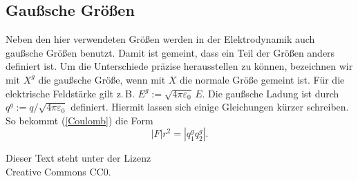 \documentclass[a4paper,10pt,fleqn,twocolumn,twoside,dvipdfmx]{scrartcl}
\begin{document}
\subsection{Gaußsche Größen}
Neben den hier verwendeten Größen werden in der Elektrodynamik
auch gaußsche Größen benutzt. Damit ist gemeint, dass ein Teil
der Größen anders definiert ist. Um die Unterschiede präzise
herausstellen zu können, bezeichnen wir mit $X^g$ die gaußsche Größe,
wenn mit $X$ die normale Größe gemeint ist.
Für die elektrische Feldstärke gilt z.\,B.
$E^g := \sqrt{4\pi\varepsilon_0}\,E$.
Die gaußsche Ladung ist durch
$q^g:=q/\sqrt{4\pi\varepsilon_0}$ definiert. Hiermit lassen
sich einige Gleichungen kürzer schreiben. So bekommt
(\ref{Coulomb}) die Form%
\begin{equation}
|F|r^2 = |q_1^g q_2^g|.
\end{equation}

\vfill
\noindent
Dieser Text steht unter der Lizenz\\
Creative Commons CC0.
\end{document}
